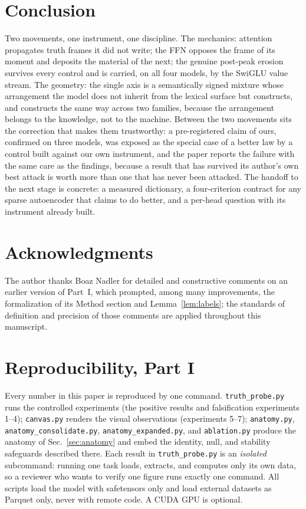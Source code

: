 \documentclass[11pt]{article}
\begin{document}
\section{Conclusion}

Two movements, one instrument, one discipline. The mechanics: attention
propagates truth frames it did not write; the FFN opposes the frame of its
moment and deposits the material of the next; the genuine post-peak erosion
survives every control and is carried, on all four models, by the SwiGLU
value stream. The geometry: the single axis is a semantically signed
mixture whose arrangement the model does not inherit from the lexical
surface but constructs, and constructs the same way across two families,
because the arrangement belongs to the knowledge, not to the machine.
Between the two movements sits the correction that makes them trustworthy:
a pre-registered claim of ours, confirmed on three models, was exposed as
the special case of a better law by a control built against our own
instrument, and the paper reports the failure with the same care as the
findings, because a result that has survived its author's own best attack is
worth more than one that has never been attacked. The handoff to the next
stage is concrete: a measured dictionary, a four-criterion contract for
any sparse autoencoder that claims to do better, and a per-head question
with its instrument already built.


\section*{Acknowledgments}

The author thanks Boaz Nadler for detailed and constructive comments on an
earlier version of Part~I, which prompted, among many improvements, the
formalization of its Method section and Lemma~\ref{lem:labels}; the
standards of definition and precision of those comments are applied
throughout this manuscript.

\section{Reproducibility, Part I}
\label{sec:repro}

Every number in this paper is reproduced by one command. \texttt{truth\_probe.py}
runs the controlled experiments (the positive results and falsification
experiments 1--4); \texttt{canvas.py} renders the visual observations
(experiments 5--7); \texttt{anatomy.py}, \texttt{anatomy\_consolidate.py},
\texttt{anatomy\_expanded.py}, and \texttt{ablation.py} produce the anatomy of
Sec.~\ref{sec:anatomy} and embed the identity, null, and stability safeguards
described there. Each result in \texttt{truth\_probe.py} is an \emph{isolated}
subcommand: running one task loads, extracts, and computes only its own data,
so a reviewer who wants to verify one figure runs exactly one command. All
scripts load the model with safetensors only and load external datasets as
Parquet only, never with remote code. A CUDA GPU is optional.
\end{document}
